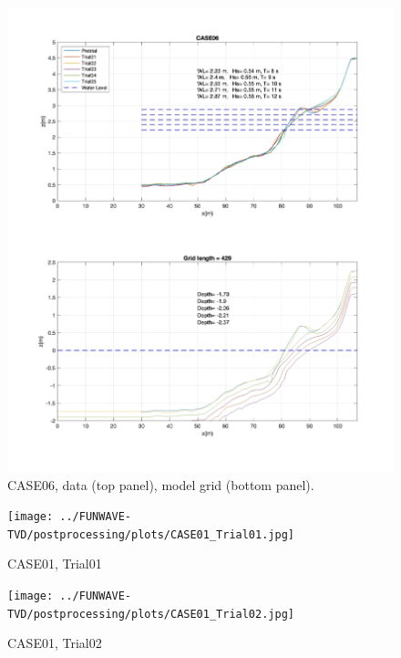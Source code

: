 \documentclass[preprint,10pt]{elsarticle}
\begin{document}
 \begin{figure}
\begin{center}
 \includegraphics[width=1.0\textwidth]{../data/preprocessing/plots/CASE06.jpg}
 \caption{CASE06, data (top panel), model grid (bottom panel).}
 \label{lineargrid}
 \end{center}
 \end{figure}

 \newpage
  
 \begin{figure}
\begin{center}
 \texttt{[image: ../FUNWAVE-TVD/postprocessing/plots/CASE01\_Trial01.jpg]}
 \caption{CASE01, Trial01}
 \label{lineargrid}
 \end{center}
 \end{figure}

\begin{figure}
\begin{center}
 \texttt{[image: ../FUNWAVE-TVD/postprocessing/plots/CASE01\_Trial02.jpg]}
 \caption{CASE01, Trial02}
 \label{lineargrid}
 \end{center}
 \end{figure}
\end{document}

